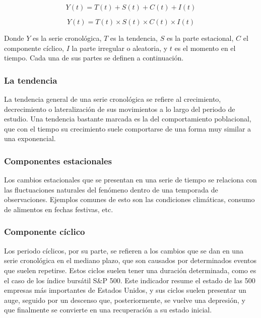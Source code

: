 \documentclass[
]{article}
\begin{document}
\begin{equation}
\label{eqn:serie_aditiva}
Y(t)=T(t)+S(t)+C(t)+I(t)
\end{equation}

\begin{equation}
\label{eqn:serie_multiplicativa}
Y(t)=T(t)\times S(t)\times C(t)\times I(t)
\end{equation}

Donde \(Y\) es la serie cronológica, \(T\) es la tendencia, \(S\) es la
parte estacional, \(C\) el componente cíclico, \(I\) la parte irregular
o aleatoria, y \(t\) es el momento en el tiempo. Cada una de sus partes
se definen a continuación.

\subsubsection{La tendencia}

La tendencia general de una serie cronológica se refiere al crecimiento,
decrecimiento o lateralización de sus movimientos a lo largo del periodo
de estudio. Una tendencia bastante marcada es la del comportamiento
poblacional, que con el tiempo su crecimiento suele comportarse de una
forma muy similar a una exponencial.

\subsubsection{Componentes estacionales}

Los cambios estacionales que se presentan en una serie de tiempo se
relaciona con las fluctuaciones naturales del fenómeno dentro de una
temporada de observaciones. Ejemplos comunes de esto son las condiciones
climáticas, consumo de alimentos en fechas festivas, etc.

\subsubsection{Componente cíclico}

Los periodo cíclicos, por su parte, se refieren a los cambios que se dan
en una serie cronológica en el mediano plazo, que son causados por
determinados eventos que suelen repetirse. Estos ciclos suelen tener una
duración determinada, como es el caso de los índice bursátil S\&P 500.
Este indicador resume el estado de las 500 empresas más importantes de
Estados Unidos, y sus ciclos suelen presentar un auge, seguido por un
descenso que, posteriormente, se vuelve una depresión, y que finalmente
se convierte en una recuperación a su estado inicial.
\end{document}
